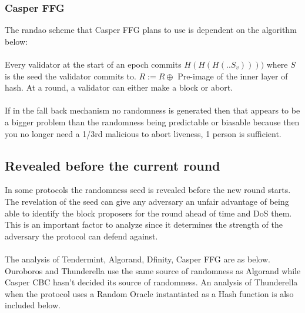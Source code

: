 \documentclass[10pt,journal,compsoc]{IEEEtran}
\begin{document}
\subsubsection{Casper FFG}
The randao scheme that Casper FFG plans to use is dependent on the algorithm below: 
\\\\
Every validator at the start of an epoch commits $H(H(H( .. S_v))))$ where 
$S$ is the seed the validator commits to. $R := R \oplus $ Pre-image of the inner layer of hash.
At a round, a validator can either make a block or abort. 
\\\\
If in the fall back mechanism no randomness is generated then that appears to be a bigger problem than the randomness being predictable or biasable because then you no longer need a 1/3rd malicious to abort liveness, 1 person is sufficient. 


\subsection{Revealed before the current round}
In some protocols the randomness seed is revealed before the new round starts. The revelation of the seed can give any adversary an unfair advantage of being able to identify the block proposers for the round ahead of time and DoS them. This is an important factor to analyze since it determines the strength of the adversary the protocol can defend against. 
\\\\ 
The analysis of Tendermint, Algorand, Dfinity, Casper FFG are as below. Ouroboros and Thunderella use the same source of randomness as Algorand while Casper CBC hasn't decided its source of randomness. An analysis of Thunderella when the protocol uses a Random Oracle instantiated as a Hash function is also included below. 
\end{document}
